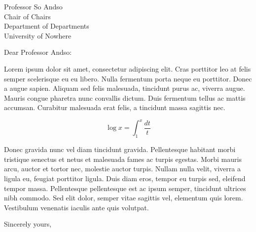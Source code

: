 \documentclass[letterpaper]{mscsletter}
\begin{document}
\begin{letter}{
Professor So Andso\\
Chair of Chairs\\
Department of Departments\\
University of Nowhere\\
}

\opening{Dear Professor Andso:}

Lorem ipsum dolor sit amet, consectetur adipiscing elit. Cras
porttitor leo at felis semper scelerisque eu eu libero. Nulla
fermentum porta neque eu porttitor. Donec a augue sapien. Aliquam sed
felis malesuada, tincidunt purus ac, viverra augue. Mauris congue
pharetra nunc convallis dictum. Duis fermentum tellus ac mattis
accumsan. Curabitur malesuada erat felis, a tincidunt massa sagittis
nec.

$$\log x = \int_1^x\frac{dt}{t}$$

Donec gravida nunc vel diam tincidunt gravida. Pellentesque habitant
morbi tristique senectus et netus et malesuada fames ac turpis
egestas. Morbi mauris arcu, auctor et tortor nec, molestie auctor
turpis. Nullam nulla velit, viverra a ligula eu, feugiat porttitor
ligula. Duis diam eros, tempor eu turpis sed, eleifend tempor
massa. Pellentesque pellentesque est ac ipsum semper, tincidunt
ultrices nibh commodo. Sed elit dolor, semper vitae sagittis vel,
elementum quis lorem. Vestibulum venenatis iaculis ante quis
volutpat.

\closing{Sincerely yours,}

\end{letter}
\end{document}
